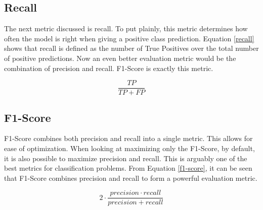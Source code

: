 \subsection{Recall}
The next metric discussed is recall. To put plainly, this metric determines how often the model is right when giving a positive class prediction. Equation \ref{recall} shows that recall is defined as the number of True Positives over the total number of positive predictions. Now an even better evaluation metric would be the combination of precision and recall. F1-Score is exactly this metric.

\begin{center}
    \begin{equation}
    \label{recall}
       \frac{TP}{TP+FP}
    \end{equation}
\end{center}

\subsection{F1-Score}
F1-Score combines both precision and recall into a single metric. This allows for ease of optimization. When looking at maximizing only the F1-Score, by default, it is also possible to maximize precision and recall. This is arguably one of the best metrics for classification problems. From Equation \ref{f1-score}, it can be seen that F1-Score combines precision and recall to form a powerful evaluation metric.
\begin{center}
    \begin{equation}
    \label{f1-score}
        2 \cdot \frac{precision \cdot recall}{precision + recall}
    \end{equation}
\end{center}

